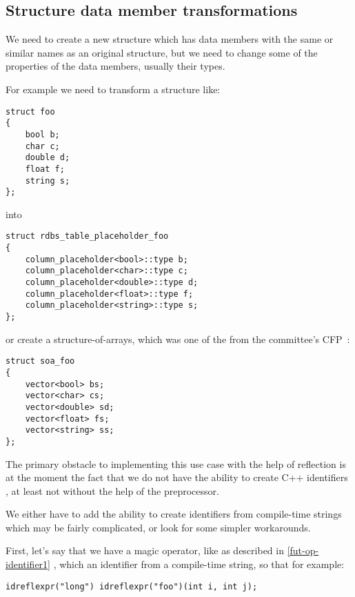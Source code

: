 \subsection{Structure data member transformations}
\label{use-case-struct-transf}

We need to create a new structure which has data members with the same or similar
names as an original structure, but we need to change some of the properties
of the data members, usually their types.

For example we need to transform a structure like:

\begin{verbatim}
struct foo
{
	bool b;
	char c;
	double d;
	float f;
	string s;
};
\end{verbatim}

into

\begin{verbatim}
struct rdbs_table_placeholder_foo
{
	column_placeholder<bool>::type b;
	column_placeholder<char>::type c;
	column_placeholder<double>::type d;
	column_placeholder<float>::type f;
	column_placeholder<string>::type s;
};
\end{verbatim}

or create a structure-of-arrays, which was one of the 
from the committee's CFP~\cite{ISOCPP-N3814}: 

\begin{verbatim}
struct soa_foo
{
	vector<bool> bs;
	vector<char> cs;
	vector<double> sd;
	vector<float> fs;
	vector<string> ss;
};
\end{verbatim}

The primary obstacle to implementing this use case with the help of reflection
is at the moment the fact that we do not have the ability to create C++
identifiers , at least not without the help of
the preprocessor.

We either have to add the ability to create identifiers from compile-time strings
which may be fairly complicated, or look for some simpler workarounds.

First, let's say that we have a magic operator, like \verb@idreflexpr@ as
described in \ref{fut-op-identifier1} , which  an identifier from
a compile-time string, so that for example:

\begin{verbatim}
idreflexpr("long") idreflexpr("foo")(int i, int j);
\end{verbatim}

